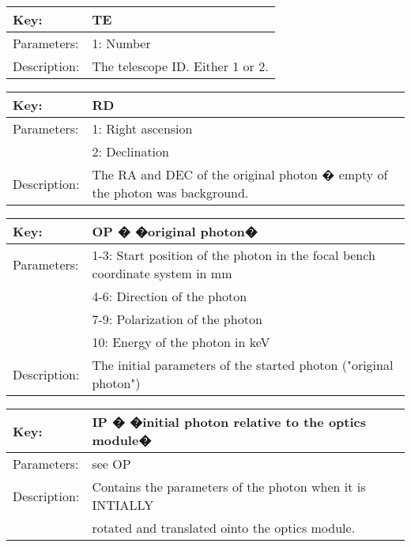 \begin{table}[htdp]
\begin{center}
\begin{tabular}{|p{2cm}|p{12cm}|}
\hline
Key:&	TE\\
\hline
Parameters:&	1: Number\\
\hline
Description:&	The telescope ID. Either 1 or 2.\\
\hline
\end{tabular}
\end{center}
\end{table}

\begin{table}[htdp]
\begin{center}
\begin{tabular}{|p{2cm}|p{12cm}|}
\hline
Key:&	RD\\
\hline
Parameters:&	1: Right ascension\\
&2: Declination\\
\hline
Description:&	The RA and DEC of the original photon � empty of the photon was background.\\
\hline
\end{tabular}
\end{center}
\end{table}

\begin{table}[htdp]
\begin{center}
\begin{tabular}{|p{2cm}|p{12cm}|}
\hline
Key:&	OP � �original photon�\\
\hline
Parameters:&	1-3: Start position of the photon in the focal bench coordinate system in mm  \\
\hline
&4-6: Direction of the photon\\
&7-9: Polarization of the photon\\
&10: Energy of the photon in keV\\
Description:&	The initial parameters of the started photon ("original photon")\\
\hline
\end{tabular}
\end{center}
\end{table}

\begin{table}[htdp]
\begin{center}
\begin{tabular}{|p{2cm}|p{12cm}|}
\hline
Key:&	IP � �initial photon relative to the optics module�\\
\hline
Parameters:&	see OP\\
\hline
Description:&	Contains the parameters of the photon when it is INTIALLY \\
&rotated and translated ointo the optics module. \\
\hline
\end{tabular}
\end{center}
\end{table}


